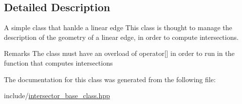 \subsection{Detailed Description}
A simple class that hanlde a linear edge  This class is thought to manage the description of the geometry of a linear edge, in order to compute intersections. \begin{DoxyRemark}{Remarks}
The class must have an overload of operator\mbox{[}\mbox{]} in order to run in the function that computes intersections 
\end{DoxyRemark}


The documentation for this class was generated from the following file:\begin{DoxyCompactItemize}
\item 
include/\hyperlink{intersector__base__class_8hpp}{intersector\_\-base\_\-class.hpp}\end{DoxyCompactItemize}
